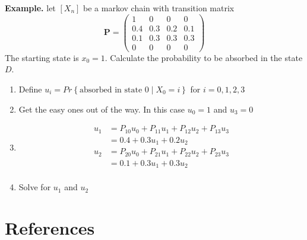 \documentclass{article}
\theoremstyle{remark}
\begin{document}
     \begin{tcolorbox}
       \textbf{Example.} let $\left[ X_{n} \right]$ be a markov chain with transition matrix \[
       \mathbf{P} = \begin{pmatrix}
       1  &  0 &  0  &  0 \\
       0.4  &  0.3  &  0.2  &  0.1 \\
       0.1  &  0.3  &  0.3 &  0.3 \\
       0  &  0 &  0 &  0 
       \end{pmatrix} 
       \] 
       The starting state is $x_{0} = 1$. Calculate the probability to be absorbed in the state $D$.
       \begin{enumerate}
         \item Define $u_{i} = Pr \left \{ \text{absorbed in state 0}  \mid  X _{0} = i \right \} $ for $i = 0,1,2,3$ 
         \item Get the easy ones out of the way. In this case $u_{0} = 1$ and $u_{3} = 0$
         \item 
           \[
           \begin{split}
            u_{1}  &  = P_{10} u_{0} + P_{11} u_{1} + P_{12} u_{2} + P_{13}u_{3}  \\
            &= 0.4 + 0.3 u_{1} + 0.2 u_{2}  \\
            u_{2} &= P_{20} u_{0} + P_{21} u_{1} + P_{22} u_{2} + P_{23} u_{3} \\
            &= 0.1 + 0.3 u_{1} + 0.3 u _{2} \\
           \end{split} 
           \] 
         \item Solve for $u_{1}$ and $u_{2}$
       \end{enumerate}
     \end{tcolorbox}
 
\section{References}%
\label{sec:references}





\end{document}
